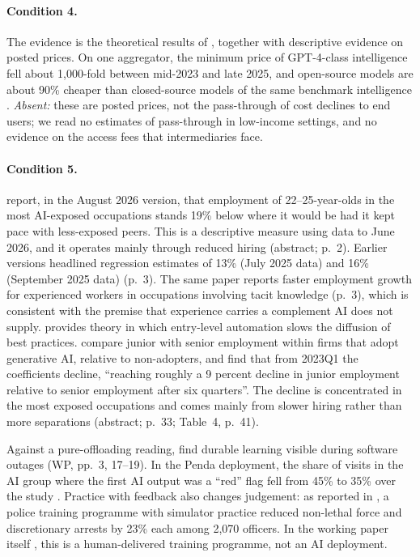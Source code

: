 \documentclass[12pt]{article}
\theoremstyle{remark}
\begin{document}
\paragraph{Condition 4.} The evidence is the theoretical results of \citet[pp.~99, 106, 110--111]{athey2026competition}, together with descriptive evidence on posted prices. On one aggregator, the minimum price of GPT-4-class intelligence fell about 1,000-fold between mid-2023 and late 2025, and open-source models are about 90\% cheaper than closed-source models of the same benchmark intelligence \citep[preprint version, 12 June 2026, pp.~11, 13]{demirer2026market}. \emph{Absent:} these are posted prices, not the pass-through of cost declines to end users; we read no estimates of pass-through in low-income settings, and no evidence on the access fees that intermediaries face.

\paragraph{Condition 5.} \citet{brynjolfsson2025canaries} report, in the August 2026 version, that employment of 22--25-year-olds in the most AI-exposed occupations stands 19\% below where it would be had it kept pace with less-exposed peers. This is a descriptive measure using data to June 2026, and it operates mainly through reduced hiring (abstract; p.~2). Earlier versions headlined regression estimates of 13\% (July 2025 data) and 16\% (September 2025 data) (p.~3). The same paper reports faster employment growth for experienced workers in occupations involving tacit knowledge (p.~3), which is consistent with the premise that experience carries a complement AI does not supply. \citet[pp.~26--28]{ide2025automation} provides theory in which entry-level automation slows the diffusion of best practices. \citet[June 2026 version, p.~5; Fig.~5, p.~31]{hosseini2025seniority} compare junior with senior employment within firms that adopt generative AI, relative to non-adopters, and find that from 2023Q1 the coefficients decline, ``reaching roughly a 9 percent decline in junior employment relative to senior employment after six quarters''. The decline is concentrated in the most exposed occupations and comes mainly from slower hiring rather than more separations (abstract; p.~33; Table~4, p.~41).

Against a pure-offloading reading, \citet{brynjolfsson2025work} find durable learning visible during software outages (WP, pp.~3, 17--19). In the Penda deployment, the share of visits in the AI group where the first AI output was a ``red'' flag fell from 45\% to 35\% over the study \citep[p.~18]{korom2025penda}. Practice with feedback also changes judgement: as reported in \citet[p.~288]{ludwig2026reflective}, a police training programme with simulator practice reduced non-lethal force and discretionary arrests by 23\% each among 2,070 officers. In the working paper itself \citep[pp.~5, 31--32]{dube2025policing}, this is a human-delivered training programme, not an AI deployment.
\end{document}
